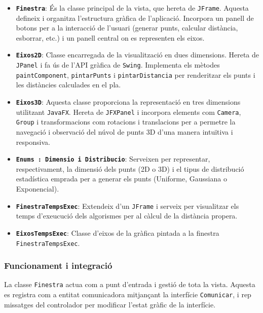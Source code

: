 \documentclass{ieeetj}
\begin{document}
\begin{itemize}
    \item \textbf{\texttt{Finestra}}: És la classe principal de la vista, que hereta de \texttt{JFrame}. Aquesta defineix i organitza l'estructura gràfica de l'aplicació. Incorpora un panell de botons per a la interacció de l'usuari (generar punts, calcular distància, esborrar, etc.) i un panell central on es representen els eixos.
    
    \item \textbf{\texttt{Eixos2D}}: Classe encarregada de la visualització en dues dimensions. Hereta de \texttt{JPanel} i fa ús de l'API gràfica de \texttt{Swing}. Implementa els mètodes \texttt{paintComponent}, \texttt{pintarPunts} i \texttt{pintarDistancia} per renderitzar els punts i les distàncies calculades en el pla.
    
    \item \textbf{\texttt{Eixos3D}}: Aquesta classe proporciona la representació en tres dimensions utilitzant \texttt{JavaFX}. Hereta de \texttt{JFXPanel} i incorpora elements com \texttt{Camera}, \texttt{Group} i transformacions com rotacions i translacions per a permetre la navegació i observació del núvol de punts 3D d'una manera intuïtiva i responsiva.
    
    \item \textbf {\texttt{Enums : Dimensio i Distribucio}}: Serveixen per representar, respectivament, la dimensió dels punts (2D o 3D) i el tipus de distribució estadística emprada per a generar els punts (Uniforme, Gaussiana o Exponencial).

    \item\textbf{ \texttt{FinestraTempsExec}}:
    Extendeix d'un \texttt{JFrame} i serveix per visualitzar els temps d'exeucució dels algorismes per al càlcul de la distància propera.
    \item \textbf{\texttt{EixosTempsExec}}: Classe d'eixos de la gràfica pintada a la finestra \texttt{FinestraTempsExec}.
    
\end{itemize}

\subsubsection*{Funcionament i integració}

La classe \texttt{Finestra} actua com a punt d'entrada i gestió de tota la vista. Aquesta es registra com a entitat comunicadora mitjançant la interfície \texttt{Comunicar}, i rep missatges del controlador per modificar l'estat gràfic de la interfície.
\end{document}
